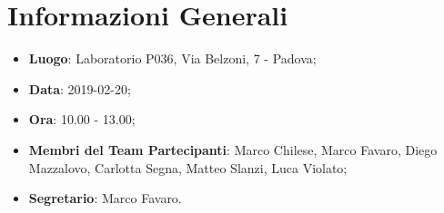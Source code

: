 \section{Informazioni Generali}
\begin{itemize}
	\item \textbf{Luogo}: Laboratorio P036, Via Belzoni, 7 - Padova;
	\item \textbf{Data}: 2019-02-20;
	\item \textbf{Ora}: 10.00 - 13.00;
	\item \textbf{Membri del Team Partecipanti}: Marco Chilese, Marco Favaro, Diego Mazzalovo, Carlotta Segna, Matteo Slanzi, Luca Violato;
	\item \textbf{Segretario}: Marco Favaro. 
\end{itemize}
